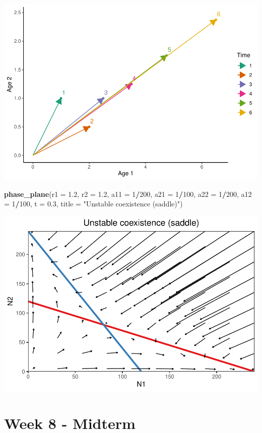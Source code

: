 \documentclass[
]{book}
\newenvironment{Shaded}{\begin{snugshade}}{\end{snugshade}}
\newcommand{\AttributeTok}[1]{\textcolor[rgb]{0.13,0.29,0.53}{#1}}
\newcommand{\DecValTok}[1]{\textcolor[rgb]{0.00,0.00,0.81}{#1}}
\newcommand{\FloatTok}[1]{\textcolor[rgb]{0.00,0.00,0.81}{#1}}
\newcommand{\FunctionTok}[1]{\textcolor[rgb]{0.13,0.29,0.53}{\textbf{#1}}}
\newcommand{\NormalTok}[1]{#1}
\newcommand{\SpecialCharTok}[1]{\textcolor[rgb]{0.81,0.36,0.00}{\textbf{#1}}}
\newcommand{\StringTok}[1]{\textcolor[rgb]{0.31,0.60,0.02}{#1}}
\begin{document}
\includegraphics{bookdown-demo_files/figure-latex/unnamed-chunk-22-1.pdf}

\begin{Shaded}
\begin{Highlighting}[]
  \FunctionTok{phase\_plane}\NormalTok{(}\AttributeTok{r1 =} \FloatTok{1.2}\NormalTok{, }\AttributeTok{r2 =} \FloatTok{1.2}\NormalTok{, }\AttributeTok{a11 =} \DecValTok{1}\SpecialCharTok{/}\DecValTok{200}\NormalTok{, }\AttributeTok{a21 =} \DecValTok{1}\SpecialCharTok{/}\DecValTok{100}\NormalTok{, }\AttributeTok{a22 =} \DecValTok{1}\SpecialCharTok{/}\DecValTok{200}\NormalTok{, }\AttributeTok{a12 =} \DecValTok{1}\SpecialCharTok{/}\DecValTok{100}\NormalTok{, }\AttributeTok{t =} \FloatTok{0.3}\NormalTok{, }\AttributeTok{title =} \StringTok{"Unstable coexistence (saddle)"}\NormalTok{)}
\end{Highlighting}
\end{Shaded}

\includegraphics{bookdown-demo_files/figure-latex/unnamed-chunk-22-2.pdf}

\hypertarget{week-8---midterm}{%
\chapter*{Week 8 - Midterm}\label{week-8---midterm}}

  
\end{document}
